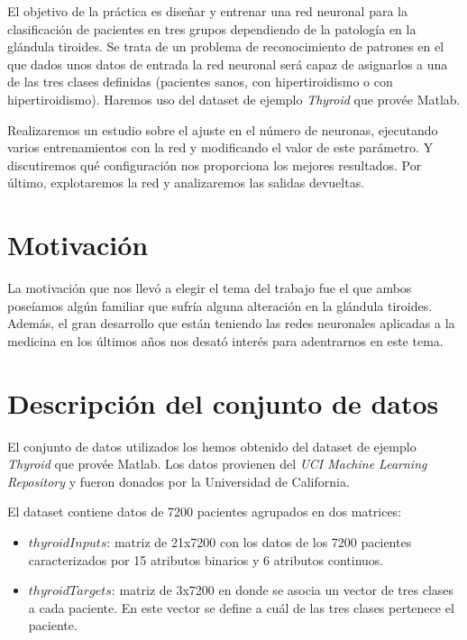 \documentclass[a4paper,12pt,titlepage]{article}
\begin{document}
El objetivo de la práctica es diseñar y entrenar una red neuronal para la clasificación de pacientes en tres grupos dependiendo de la patología en la glándula tiroides. Se trata de un problema de reconocimiento de patrones en el que dados unos datos de entrada la red neuronal será capaz de asignarlos a una de las tres clases definidas (pacientes sanos, con hipertiroidismo o con hipertiroidismo). Haremos uso del dataset de ejemplo \emph{Thyroid} que provée Matlab.

Realizaremos un estudio sobre el ajuste en el número de neuronas, ejecutando varios entrenamientos con la red y modificando el valor de este parámetro. Y discutiremos qué configuración nos proporciona los mejores resultados. Por último, explotaremos la red y analizaremos las salidas devueltas.

\section{Motivación}

La motivación que nos llevó a elegir el tema del trabajo fue el que ambos poseíamos algún familiar que sufría alguna alteración en la glándula tiroides. Además, el gran desarrollo que están teniendo las redes neuronales aplicadas a la medicina en los últimos años nos desató interés para adentrarnos en este tema.

\section{Descripción del conjunto de datos}

El conjunto de datos utilizados los hemos obtenido del dataset de ejemplo \emph{Thyroid} que provée Matlab. Los datos provienen del \emph{UCI Machine Learning Repository} \citep{Asuncion+Newman:2007} y fueron donados por la Universidad de California.

El dataset contiene datos de 7200 pacientes agrupados en dos matrices:

\begin{itemize}[noitemsep]
	\item $thyroidInputs$: matriz de 21x7200 con los datos de los 7200 pacientes caracterizados por 15 atributos binarios y 6 atributos continuos.
	\item $thyroidTargets$: matriz de 3x7200 en donde se asocia un vector de tres clases a cada paciente. En este vector se define a cuál de las tres clases pertenece el paciente.
\end{itemize}
\end{document}
